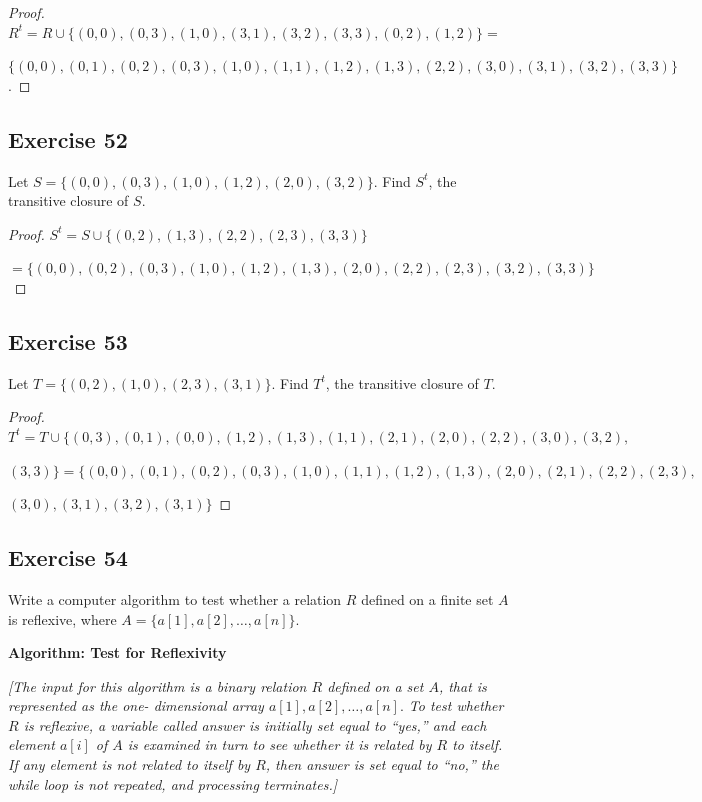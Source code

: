 \documentclass[14pt]{extarticle}
\newcommand{\cy}{\color{cyan}}
\begin{document}
\begin{proof}
\(R^t = R \cup \{(0, 0), (0, 3), (1, 0), (3, 1), (3, 2), (3, 3), (0, 2), (1, 2)\} = \) 

\(\{(0, 0), (0, 1), (0, 2), (0, 3), (1, 0), (1, 1), (1, 2), (1, 3), (2, 2), (3, 0), (3, 1), (3, 2), (3, 3)\}\).
\end{proof}

\subsection{Exercise 52}
Let \(S = \{(0, 0), (0, 3), (1, 0), (1, 2), (2, 0), (3, 2)\}\). Find \(S^t\), the transitive closure of \(S\).

\begin{proof}
\(S^t = S \cup \{(0,2),(1,3),(2,2),(2,3),(3,3)\}\)

\( = \{(0, 0), (0,2),(0, 3), (1, 0), (1, 2), (1,3),(2, 0),(2,2), (2,3),(3, 2),(3,3)\}\)
\end{proof}

\subsection{Exercise 53}
Let \(T = \{(0, 2), (1, 0), (2, 3), (3, 1)\}\). Find \(T^t\), the transitive closure of \(T\).

\begin{proof}
\(T^t = T \cup \{(0,3),(0,1),(0,0),(1,2),(1,3),(1,1),(2,1),(2,0),(2,2),(3,0),(3,2),\)

\((3,3)\} = \{(0,0),(0,1),(0, 2),(0,3), (1, 0),(1, 1),(1, 2),(1, 3), (2,0),(2,1),(2,2),(2, 3),\)

\((3,0),(3,1),(3,2),(3, 1)\}\)
\end{proof}

\subsection{Exercise 54}
Write a computer algorithm to test whether a relation \(R\) defined on a finite set \(A\) is reflexive, where 
\(A = \{a[1], a[2], \ldots, a[n]\}\).

\begin{tcolorbox}[colframe=cyan]
{\bf \cy Algorithm: Test for Reflexivity} 

{\it [The input for this algorithm is a binary relation $R$ defined on a set $A$, that is represented as the one-
dimensional array \(a[1], a[2], \ldots, a[n].\) To test whether $R$ is reflexive, a variable called answer is 
initially set equal to “yes,” and each element \(a[i]\) of $A$ is examined in turn to see whether it is related by $R$ 
to itself. If any element is not related to itself by $R$, then answer is set equal to “no,” the while loop is not 
repeated, and processing terminates.]}
\end{tcolorbox}
\end{document}
